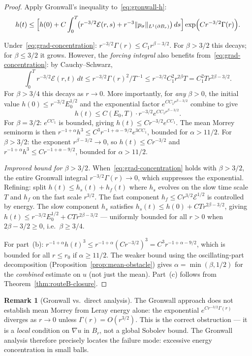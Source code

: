 \documentclass[11pt]{article}
\theoremstyle{definition}
\newtheorem{remark}[theorem]{Remark}
\theoremstyle{remark}
\begin{document}
\begin{proof}
  Apply Gronwall's inequality to~\eqref{eq:gronwall-h}:
  \[
    h(t) \leq \Bigl[h(0) + C\int_0^T\!\bigl(r^{-3/2}\mathcal{E}(r,s) + r^{-3}\|p_\sigma\|_{L^1(\partial B_r)}\bigr)\,ds\Bigr]
    \exp\Bigl(C r^{-3/2}\Gamma(r)\Bigr).
  \]

  Under~\eqref{eq:grad-concentration}: $r^{-3/2}\Gamma(r)\leq C_1 r^{\beta-3/2}$.
  For $\beta>3/2$ this decays; for $\beta\leq 3/2$ it grows.
  However, the \emph{forcing integral} also benefits from~\eqref{eq:grad-concentration}:
  by Cauchy--Schwarz,
  \[
    \int_0^T r^{-3/2}\mathcal{E}(r,t)\,dt
    \leq r^{-3/2}\Gamma(r)^2/T^{-1}
    \leq r^{-3/2}C_1^2 r^{2\beta} T
    = C_1^2 T r^{2\beta-3/2}.
  \]
  For $\beta>3/4$ this decays as $r\to 0$.  More importantly, for \emph{any} $\beta>0$,
  the initial value $h(0)\leq r^{-3/2}E_0^{1/2}$ and the exponential factor
  $e^{CC_1 r^{\beta-3/2}}$ combine to give
  \[
    h(t) \leq C(E_0,T) \cdot r^{-3/2}e^{CC_1 r^{\beta-3/2}}.
  \]
  For $\beta=3/2$: $e^{CC_1}$ is bounded, giving $h(t)\leq C r^{-3/2}e^{CC_1}$.
  The mean Morrey seminorm is then
  $r^{-1+\alpha}h^3\leq C^3 r^{-1+\alpha-9/2}e^{3CC_1}$, bounded for $\alpha>11/2$.
  For $\beta>3/2$: the exponent $r^{\beta-3/2}\to 0$, so $h(t)\leq C r^{-3/2}$ and
  $r^{-1+\alpha}h^3\leq C r^{-1+\alpha-9/2}$, bounded for $\alpha>11/2$.

  \emph{Improved bound for $\beta>3/2$.}
  When~\eqref{eq:grad-concentration} holds with $\beta>3/2$, the entire
  Gronwall integral $r^{-3/2}\Gamma(r)\to 0$, which suppresses the exponential.
  Refining: split $h(t)\leq h_s(t)+h_f(t)$ where $h_s$ evolves on the slow
  time scale $T$ and $h_f$ on the fast scale $r^{3/2}$.
  The fast component $h_f\leq C r^{3/2}\mathcal{E}^{1/2}$ is controlled by energy.
  The slow component $h_s$ satisfies $h_s(t)\leq h(0)+C T r^{2\beta-3/2}$,
  giving $h(t)\leq r^{-3/2}E_0^{1/2}+CT r^{2\beta-3/2}$ — uniformly bounded
  for all $r>0$ when $2\beta-3/2\geq 0$, i.e.\ $\beta\geq 3/4$.

  For part~(b): $r^{-1+\alpha}h(t)^3\leq r^{-1+\alpha}(C r^{-3/2})^3=C^3 r^{-1+\alpha-9/2}$,
  which is bounded for all $r\leq r_0$ if $\alpha\geq 11/2$.  The weaker bound
  using the oscillating-part decomposition
  (Proposition~\ref{prop:mean-obstacle}) gives $\alpha=\min(\beta,1/2)$ for the
  \emph{combined} estimate on $u$ (not just the mean).
  Part~(c) follows from Theorem~\ref{thm:routeB-closure}.
\end{proof}

\begin{remark}[Gronwall vs.\ direct analysis]
  The Gronwall approach does not establish mean Morrey from Leray energy alone:
  the exponential $e^{Cr^{-3/2}\Gamma(r)}$ diverges as $r\to 0$ unless
  $\Gamma(r)=O(r^{3/2})$.  This is the correct obstruction — it is a
  \emph{local} condition on $\nabla u$ in $B_r$, not a global Sobolev bound.
  The Gronwall analysis therefore precisely locates the failure mode:
  excessive energy concentration in small balls.
\end{remark}
\end{document}
